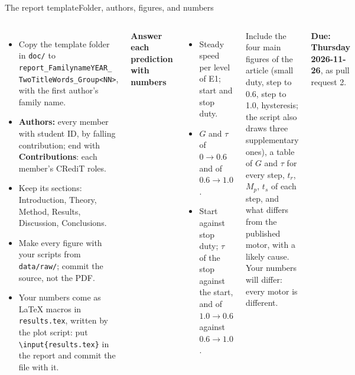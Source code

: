 \begin{frame}{The report template}{Folder, authors, figures, and numbers}
  \label{app:report-template}
  \footnotesize
  \begin{columns}[T]
    \scriptsize
    \begin{itemize}\setlength{\itemsep}{0pt}
      \item \alert{Copy the template folder} in \texttt{doc/} to\\ \texttt{report\_FamilynameYEAR\_}\\ \texttt{TwoTitleWords\_Group<NN>}, with the first author's family name.
      \item \textbf{Authors:} every member with student ID, by falling contribution; end with \textbf{Contributions}: each member's CRediT roles.
      \item Keep its sections: Introduction, Theory, Method, Results, Discussion, Conclusions.
      \item Make every figure with your scripts from \texttt{data/raw/}; commit the source, not the PDF.
      \item Your numbers come as \LaTeX{} macros in \texttt{results.tex}, written by the plot script: put \texttt{\textbackslash input\{results.tex\}} in the report and commit the file with it.
    \end{itemize}
    \scriptsize
    \textbf{Answer each prediction with numbers}
    \begin{itemize}\setlength{\itemsep}{2pt}
      \item[\textbf{P1}] Steady speed per level of E1; start and stop duty.
      \item[\textbf{P2}] $G$ and $\tau$ of $0 \to 0.6$ and of $0.6 \to 1.0$.
      \item[\textbf{P3}] Start against stop duty; $\tau$ of the stop against the start, and of $1.0 \to 0.6$ against $0.6 \to 1.0$.
    \end{itemize}
    Include the four main figures of the article (small duty, step to 0.6, step to 1.0, hysteresis; the script also draws three supplementary ones), a table of $G$ and $\tau$ for every step, $t_r$, $M_p$, $t_s$ of each step, and what differs from the published motor, with a likely cause.
    {\scriptsize Your numbers will differ: every motor is different.}

    \vspace{3pt}
    \alert{\textbf{Due: Thursday 2026-11-26}}, as pull request 2.
  \end{columns}
\end{frame}
